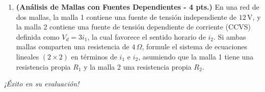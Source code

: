 \documentclass[12pt, a4paper]{article}
\begin{document}
\begin{enumerate}[leftmargin=*, itemsep=2em]
    \item \textbf{(Análisis de Mallas con Fuentes Dependientes - 4 pts.)} En una red de dos mallas, la malla 1 contiene una fuente de tensión independiente de $12\,\text{V}$, y la malla 2 contiene una fuente de tensión dependiente de corriente (CCVS) definida como $V_d = 3 i_1$, la cual favorece el sentido horario de $i_2$. Si ambas mallas comparten una resistencia de $4\,\Omega$, formule el sistema de ecuaciones lineales $(2 \times 2)$ en términos de $i_1$ e $i_2$, asumiendo que la malla 1 tiene una resistencia propia $R_1$ y la malla 2 una resistencia propia $R_2$.

\end{enumerate}

\vspace{1cm}
\begin{center}
    \textit{¡Éxito en su evaluación!}
\end{center}
\end{document}

